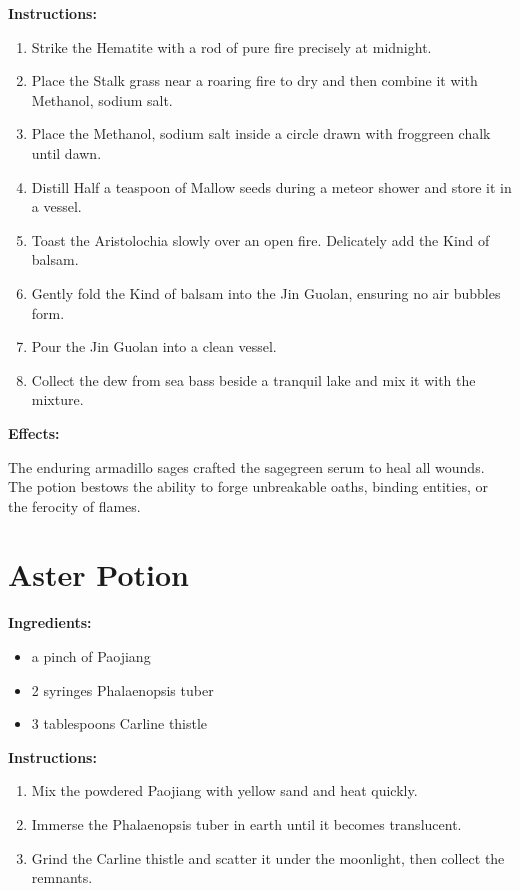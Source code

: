 \documentclass{article}
\begin{document}
\textbf{Instructions:}

\begin{enumerate}
  \item Strike the Hematite with a rod of pure fire precisely at midnight.
  \item Place the Stalk grass near a roaring fire to dry and then combine it with Methanol, sodium salt.
  \item Place the Methanol, sodium salt inside a circle drawn with froggreen chalk until dawn.
  \item Distill Half a teaspoon of Mallow seeds during a meteor shower and store it in a vessel.
  \item Toast the Aristolochia slowly over an open fire. Delicately add the Kind of balsam.
  \item Gently fold the Kind of balsam into the Jin Guolan, ensuring no air bubbles form.
  \item Pour the Jin Guolan into a clean vessel.
  \item Collect the dew from sea ​​bass beside a tranquil lake and mix it with the mixture.
\end{enumerate}

\textbf{Effects:}

The enduring armadillo sages crafted the sagegreen serum to heal all wounds. The potion bestows the ability to forge unbreakable oaths, binding entities, or the ferocity of flames.

\newpage
\section*{Aster Potion}

\textbf{Ingredients:}

\begin{itemize}
  \item a pinch of Paojiang
  \item 2 syringes Phalaenopsis tuber
  \item 3 tablespoons Carline thistle
\end{itemize}

\textbf{Instructions:}

\begin{enumerate}
  \item Mix the powdered Paojiang with yellow sand and heat quickly.
  \item Immerse the Phalaenopsis tuber in earth until it becomes translucent.
  \item Grind the Carline thistle and scatter it under the moonlight, then collect the remnants.
\end{enumerate}
\end{document}
